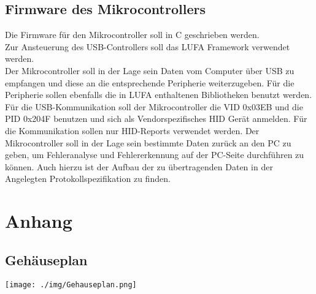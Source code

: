 \subsection{Firmware des Mikrocontrollers}

Die Firmware für den Mikrocontroller soll in C geschrieben werden.\\
Zur Ansteuerung des USB-Controllers soll das LUFA Framework verwendet werden.\\
Der Mikrocontroller soll in der Lage sein Daten vom Computer über USB zu empfangen und diese
an die entsprechende Peripherie weiterzugeben. Für die Peripherie sollen ebenfalls die in LUFA enthaltenen Bibliotheken
benutzt werden.\\
Für die USB-Kommunikation soll der Mikrocontroller die VID 0x03EB und die PID 0x204F benutzen und sich als Vendorspezifisches HID Gerät anmelden. Für die Kommunikation sollen nur HID-Reports verwendet werden. Der Mikrocontroller soll in der Lage sein bestimmte Daten zurück an den PC zu geben, um Fehleranalyse und Fehlererkennung auf der PC-Seite durchführen zu können.
Auch hierzu ist der Aufbau der zu übertragenden Daten in der Angelegten Protokollspezifikation zu finden.
\pagebreak
\section{Anhang}
\subsection{Gehäuseplan}
\texttt{[image: ./img/Gehauseplan.png]}
